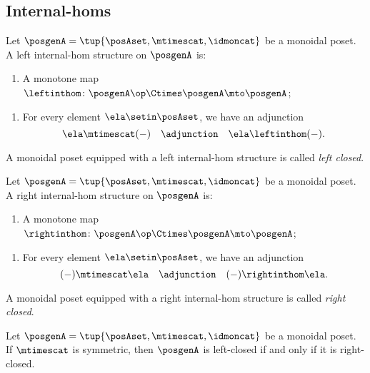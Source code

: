 \subsection{Internal-homs}

\begin{ctdefinition}
\label{def:left-internal-hom-monoidal-poset}
Let $\posgenA = \tup{\posAset, \mtimescat, \idmoncat}$ be a monoidal poset. A left internal-hom structure on $\posgenA$ is:

\constit
\begin{enumerate}
\item A monotone map $\leftinthom \colon \posgenA\op \Ctimes \posgenA \mto \posgenA$; 
\end{enumerate}

\condit
\begin{enumerate}
\item For every element $\ela \setin \posAset$, we have an adjunction 
\begin{equation}
\ela \mtimescat ( - ) \quad  \adjunction \quad \ela \leftinthom ( - ).
\end{equation}
\end{enumerate}
A monoidal poset equipped with a left internal-hom structure is called \emph{left closed}.
\end{ctdefinition}

\begin{ctdefinition}
\label{def:right-internal-hom-monoidal-poset}
Let $\posgenA = \tup{\posAset, \mtimescat, \idmoncat}$ be a monoidal poset. A right internal-hom structure on $\posgenA$ is:

\constit
\begin{enumerate}
\item A monotone map $\rightinthom \colon \posgenA\op \Ctimes \posgenA \mto \posgenA$; 
\end{enumerate}

\condit
\begin{enumerate}
\item For every element $\ela \setin \posAset$, we have an adjunction 
\begin{equation}
( - ) \mtimescat \ela \quad  \adjunction \quad ( - ) \rightinthom \ela.
\end{equation}
\end{enumerate}
A monoidal poset equipped with a right internal-hom structure is called \emph{right closed}.
\end{ctdefinition}

\begin{lemma}
\label{lem:symmetric-left-right-closed-monoidal-poset-cat}
Let $\posgenA = \tup{\posAset, \mtimescat, \idmoncat}$ be a monoidal poset. If $\mtimescat$ is symmetric, then $\posgenA$ is left-closed if and only if it is right-closed.
\end{lemma}

